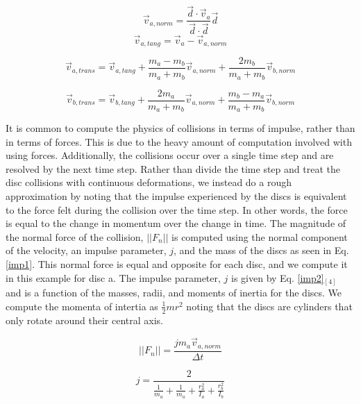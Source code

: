 \documentclass[pdftext,twoside,10pt]{article}
\begin{document}
\begin{equation}
\vec{v}_{a,norm} = \frac{\vec{d} \cdot \vec{v}_a}{\vec{d} \cdot \vec{d}} \vec{d}
 \label{vnorm}
\end{equation}
\begin{equation}
\vec{v}_{a,tang} = \vec{v}_{a} - \vec{v}_{a,norm} 
 \label{vtang}
\end{equation}

\begin{equation}
\vec{v}_{a, trans} = \vec{v}_{a,tang} + \frac{m_a - m_b}{m_a+m_b}\vec{v}_{a,norm} +  \frac{2m_b}{m_a+m_b}\vec{v}_{b,norm}
 \label{elast1}
\end{equation}

\begin{equation}
\vec{v}_{b, trans} = \vec{v}_{b,tang} + \frac{2m_a}{m_a+m_b}\vec{v}_{a,norm} +  \frac{m_b - m_a}{m_a+m_b}\vec{v}_{b,norm}
 \label{elast2}
\end{equation}

It is common to compute the physics of collisions in terms of impulse, rather than in terms of forces. This is due to the heavy amount of computation involved with using forces. Additionally, the collisions occur over a single time step and are resolved by the next time step. Rather than divide the time step and treat the disc collisions with continuous deformations, we instead do a rough approximation by noting that the impulse experienced by the discs is equivalent to the force felt during the collision over the time step. In other words, the force is equal to the change in momentum over the change in time. The magnitude of the normal force of the collision, $||F_n||$ is computed using the normal component of the velocity, an impulse parameter, $j$, and the mass of the discs as seen in Eq. \ref{imp1}. This normal force is equal and opposite for each disc, and we compute it in this example for disc a. The impulse parameter, $j$ is given by Eq. \ref{imp2}$_{[4]}$ and is a function of the masses, radii, and moments of inertia for the discs. We compute the momenta of intertia as $\frac{1}{2}mr^2$ noting that the discs are cylinders that only rotate around their central axis.

\begin{equation}
||F_n|| = \frac{jm_a\vec{v}_{a,norm} }{\Delta t}
 \label{imp1}
\end{equation}

\begin{equation}
j = \frac{2}{ \frac{1}{m_a} + \frac{1}{m_a} + \frac{r_a^2}{I_a} + \frac{r_b^2}{I_b} }
 \label{imp2}
\end{equation}
\end{document}
